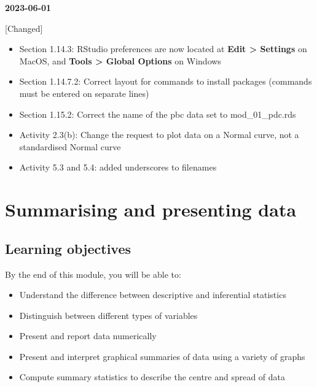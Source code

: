 \documentclass[
  a4paper,
]{memoir}
\providecommand{\tightlist}{%
  \setlength{\itemsep}{0pt}\setlength{\parskip}{0pt}}\usepackage{longtable,booktabs,array}
\begin{document}
\textbf{2023-06-01}

{[}Changed{]}

\begin{itemize}
\tightlist
\item
  Section 1.14.3: RStudio preferences are now located at \textbf{Edit
  \textgreater{} Settings} on MacOS, and \textbf{Tools \textgreater{}
  Global Options} on Windows
\item
  Section 1.14.7.2: Correct layout for commands to install packages
  (commands must be entered on separate lines)
\item
  Section 1.15.2: Correct the name of the pbc data set to
  mod\_01\_pdc.rds
\item
  Activity 2.3(b): Change the request to plot data on a Normal curve,
  not a standardised Normal curve
\item
  Activity 5.3 and 5.4: added underscores to filenames
\end{itemize}


\hypertarget{summarising-and-presenting-data}{%
\chapter{Summarising and presenting
data}\label{summarising-and-presenting-data}}

\hypertarget{learning-objectives}{%
\section*{Learning objectives}\label{learning-objectives}}


By the end of this module, you will be able to:

\begin{itemize}
\tightlist
\item
  Understand the difference between descriptive and inferential
  statistics
\item
  Distinguish between different types of variables
\item
  Present and report data numerically
\item
  Present and interpret graphical summaries of data using a variety of
  graphs
\item
  Compute summary statistics to describe the centre and spread of data
\end{itemize}
\end{document}
